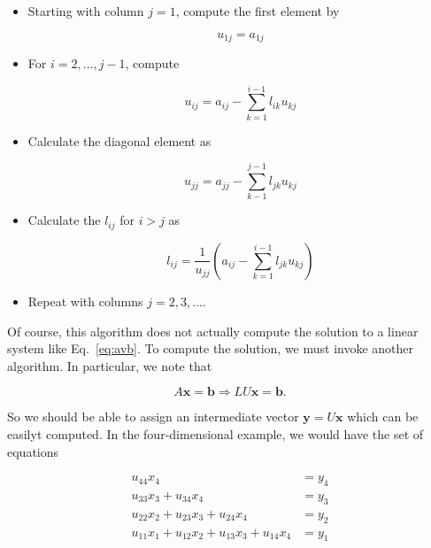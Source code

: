 \documentclass[12pt]{article}
\numberwithin{equation}{section}
\begin{document}
\begin{itemize}
\item Starting with column $j=1$, compute the first element by 

\begin{equation}
u_{1j}=a_{1j}
\end{equation}

\item For $i=2,\ldots,j-1$, compute

\begin{equation}
u_{ij}=a_{ij}-\sum_{k=1}^{i-1}l_{ik}u_{kj}
\end{equation}

\item Calculate the diagonal element as

\begin{equation}
u_{jj}=a_{jj}-\sum_{k-1}^{j-1} l_{jk}u_{kj}
\end{equation}

\item Calculate the $l_{ij}$ for $i>j$ as

\begin{equation}
l_{ij}=\frac{1}{u_{jj}}\left(a_{ij}-\sum_{k=1}^{i-1} l_{jk}u_{kj}\right)
\end{equation}

\item Repeat with columns $j=2,3,\ldots$.
\end{itemize}

\noindent Of course, this algorithm does not actually compute the solution to a linear system like Eq.~\ref{eq:avb}.  To compute the solution, we must invoke another algorithm.  In particular, we note that

\begin{equation}
A\textbf{x}=\textbf{b}\Rightarrow LU\textbf{x}=\textbf{b}.
\end{equation}

\noindent So we should be able to assign an intermediate vector $\textbf{y}=U\textbf{x}$ which can be easilyt computed.  In the four-dimensional example, we would have the set of equations

\begin{equation}
\begin{align}
u_{44}x_{4}&=y_{4} \\
u_{33}x_{3}+u_{34}x_{4}&=y_{3} \\
u_{22}x_{2}+u_{23}x_{3}+u_{24}x_{4}&=y_{2} \\
u_{11}x_{1}+u_{12}x_{2}+u_{13}x_{3}+u_{14}x_{4}&= y_{1}
\end{align}
\end{equation}
\end{document}
